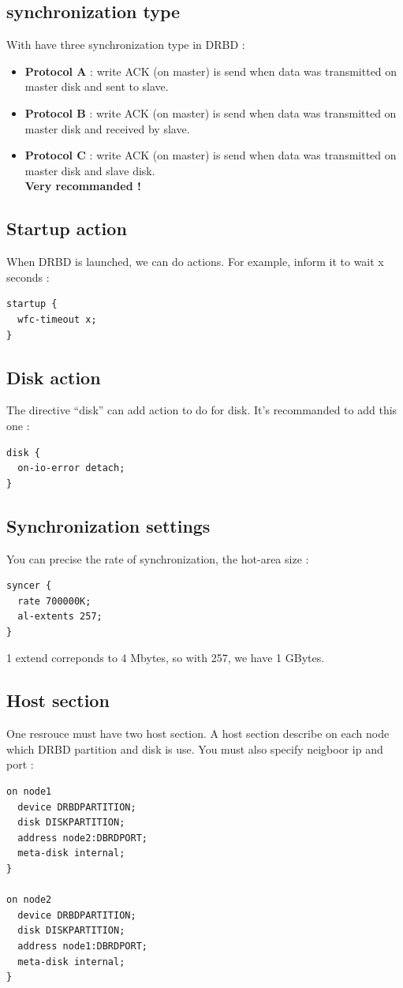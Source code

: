 \documentclass[a4paper,10pt]{report}
\begin{document}
\subsection{synchronization type}
With have three synchronization type in DRBD :
\begin{itemize}
\item \textbf{Protocol A} : write ACK (on master) is send when data was transmitted on master disk and sent to slave.
\item \textbf{Protocol B} : write ACK (on master) is send when data was transmitted on master disk and received by slave.
\item \textbf{Protocol C} : write ACK (on master) is send when data was transmitted on master disk and slave disk.\\
\textbf{Very recommanded !}
\end{itemize}

\subsection{Startup action}
When DRBD is launched, we can do actions. For example, inform it to wait x seconds :
\begin{lstlisting}
startup {
  wfc-timeout x;
}
\end{lstlisting}

\subsection{Disk action}
The directive ``disk'' can add action to do for disk. It's recommanded to add this one :
\begin{lstlisting}
disk {
  on-io-error detach;
}
\end{lstlisting}

\subsection{Synchronization settings}
You can precise the rate of synchronization, the hot-area size :
\begin{lstlisting}
syncer {
  rate 700000K;
  al-extents 257;
}
\end{lstlisting}
1 extend correponds to 4 Mbytes, so with 257, we have 1 GBytes.

\subsection{Host section}
One resrouce must have two host section. A host section describe on each node which DRBD partition and disk is use. You must also specify neigboor ip and port :
\begin{lstlisting}
on node1 
  device DRBDPARTITION;
  disk DISKPARTITION;
  address node2:DBRDPORT;
  meta-disk internal;
}

on node2 
  device DRBDPARTITION;
  disk DISKPARTITION;
  address node1:DBRDPORT;
  meta-disk internal;
}
\end{lstlisting}
\end{document}
